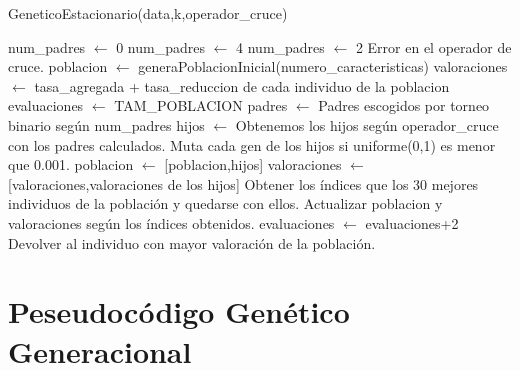 \documentclass[12pt,a4paper]{article}
\begin{document}
	\begin{algorithm}
		\caption{GeneticoEstacionario(data,k,operador\_cruce)}
		\begin{algorithmic}
			\STATE num\_padres $\leftarrow$ 0
				\STATE num\_padres $\leftarrow$ 4
				\STATE num\_padres $\leftarrow$ 2
			\ELSE
				\STATE Error en el operador de cruce.
			\ENDIF
			\STATE
			\STATE poblacion $\leftarrow$ generaPoblacionInicial(numero\_caracteristicas)
			\STATE valoraciones $\leftarrow$ tasa\_agregada + tasa\_reduccion de cada individuo de la poblacion
			\STATE evaluaciones $\leftarrow$ TAM\_POBLACION
				\STATE padres $\leftarrow$ Padres escogidos por torneo binario según num\_padres
				\STATE hijos $\leftarrow$ Obtenemos los hijos según operador\_cruce con los padres calculados.
				\STATE
				\STATE Muta cada gen de los hijos si uniforme(0,1) es menor que 0.001.
				\STATE poblacion $\leftarrow$ [poblacion,hijos]
				\STATE valoraciones $\leftarrow$ [valoraciones,valoraciones de los hijos]
				\STATE Obtener los índices que los 30 mejores individuos de la población y quedarse con ellos.
				\STATE Actualizar poblacion y valoraciones según los índices obtenidos.
				\STATE evaluaciones $\leftarrow$ evaluaciones+2
			\ENDWHILE
			\RETURN Devolver al individuo con mayor valoración de la población.
		\end{algorithmic}
	\end{algorithm}

	\newpage

	\section{Peseudocódigo Genético Generacional}
	\label{sec:GG}
\end{document}
